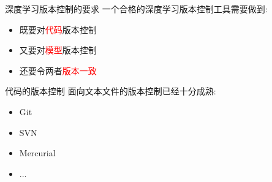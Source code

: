 \documentclass{beamer}
\begin{document}
\begin{frame}{深度学习版本控制的要求}
一个合格的深度学习版本控制工具需要做到:
\begin{itemize}
    \item 既要对\textcolor{red}{代码}版本控制
    \item 又要对\textcolor{red}{模型}版本控制
    \item 还要令两者\textcolor{red}{版本一致}
\end{itemize}
\end{frame}

\begin{frame}{代码的版本控制}
面向文本文件的版本控制已经十分成熟:
\begin{itemize}
    \item Git
    \item SVN
    \item Mercurial
    \item ...
\end{itemize}
\end{frame}
\end{document}
